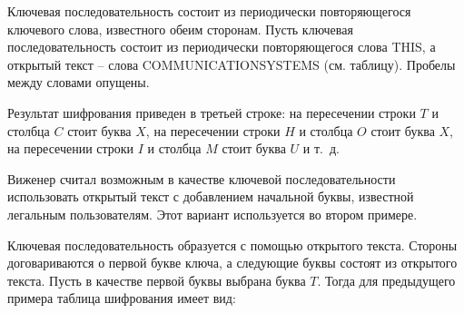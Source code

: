 \example
Ключевая последовательность состоит из периодически повторяющегося ключевого слова, известного обеим сторонам. Пусть ключевая последовательность состоит из периодически повторяющегося слова THIS, а открытый текст -- слова COMMUNICATIONSYSTEMS (см. таблицу). Пробелы между словами опущены.
\begin{center}  \end{center}
Результат шифрования приведен в третьей строке: на пересечении строки $T$ и столбца $C$ стоит буква $X$, на пересечении строки $H$ и столбца $O$ стоит буква $X$, на пересечении строки $I$ и столбца  $M$ стоит буква $U$ и т.~д.
\exampleend

Виженер считал возможным в качестве ключевой последовательности использовать открытый текст с добавлением начальной буквы, известной легальным пользователям. Этот вариант используется во втором примере.

\example
Ключевая последовательность образуется с помощью открытого текста. Стороны договариваются о первой букве ключа, а следующие буквы состоят из открытого текста. Пусть в качестве первой буквы выбрана буква  $T$. Тогда для предыдущего примера таблица шифрования имеет вид:
\begin{center}  \end{center}
\exampleend

